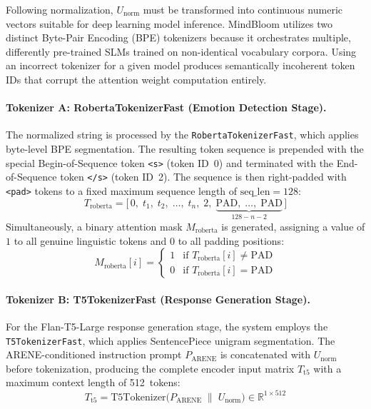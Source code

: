 \documentclass[12pt,twoside]{article}
\begin{document}
Following normalization, $U_{\text{norm}}$ must be transformed into continuous numeric vectors suitable for deep learning model inference. MindBloom utilizes two distinct Byte-Pair Encoding (BPE) tokenizers because it orchestrates multiple, differently pre-trained SLMs trained on non-identical vocabulary corpora. Using an incorrect tokenizer for a given model produces semantically incoherent token IDs that corrupt the attention weight computation entirely.

\paragraph{Tokenizer A: RobertaTokenizerFast (Emotion Detection Stage).}
The normalized string is processed by the \texttt{RobertaTokenizerFast}, which applies byte-level BPE segmentation. The resulting token sequence is prepended with the special Begin-of-Sequence token \texttt{<s>} (token ID~0) and terminated with the End-of-Sequence token \texttt{</s>} (token ID~2). The sequence is then right-padded with \texttt{<pad>} tokens to a fixed maximum sequence length of $\text{seq\_len} = 128$:
\begin{equation}
  T_{\text{roberta}} = \bigl[\, 0,\; t_1,\; t_2,\; \ldots,\; t_n,\; 2,\; \underbrace{\text{PAD},\; \ldots,\; \text{PAD}}_{128-n-2}\,\bigr]
\end{equation}
Simultaneously, a binary attention mask $M_{\text{roberta}}$ is generated, assigning a value of $1$ to all genuine linguistic tokens and $0$ to all padding positions:
\begin{equation}
  M_{\text{roberta}}[i] = \begin{cases} 1 & \text{if } T_{\text{roberta}}[i] \neq \text{PAD} \\ 0 & \text{if } T_{\text{roberta}}[i] = \text{PAD} \end{cases}
\end{equation}

\paragraph{Tokenizer B: T5TokenizerFast (Response Generation Stage).}
For the Flan-T5-Large response generation stage, the system employs the \texttt{T5TokenizerFast}, which applies SentencePiece unigram segmentation. The ARENE-conditioned instruction prompt $P_{\text{ARENE}}$ is concatenated with $U_{\text{norm}}$ before tokenization, producing the complete encoder input matrix $T_{\text{t5}}$ with a maximum context length of 512~tokens:
\begin{equation}
  T_{\text{t5}} = \text{T5Tokenizer}\bigl(P_{\text{ARENE}} \;\|\; U_{\text{norm}}\bigr) \in \mathbb{R}^{1 \times 512}
\end{equation}
\end{document}
